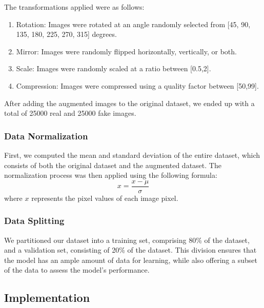             The transformations applied were as follows:
        \begin{enumerate}
            \item Rotation: Images were rotated at an angle randomly selected from [45, 90, 135, 180, 225, 270, 315] degrees.
            \item Mirror: Images were randomly flipped horizontally, vertically, or both.
            \item Scale: Images were randomly scaled at a ratio between [0.5,2].
            \item Compression: Images were compressed using a quality factor between [50,99].
        \end{enumerate}

        After adding the augmented images to the original dataset, we ended up with a total of 25000 real and 25000 fake images.

        \subsubsection{Data Normalization}
            First, we computed the mean and standard deviation of the entire dataset, which consists of both the original dataset and the augmented dataset. The normalization process was then applied using the following formula:
            \begin{equation}
            x = \frac{x - \mu}{\sigma}
            \end{equation}
            where \(x\) represents the pixel values of each image pixel.

        \subsubsection{Data Splitting}
            We partitioned our dataset into a training set, comprising 80\% of the dataset, and a validation set, consisting of 20\% of the dataset. This division ensures that the model has an ample amount of data for learning, while also offering a subset of the data to assess the model's performance.


        \subsection{Implementation}
        
        
